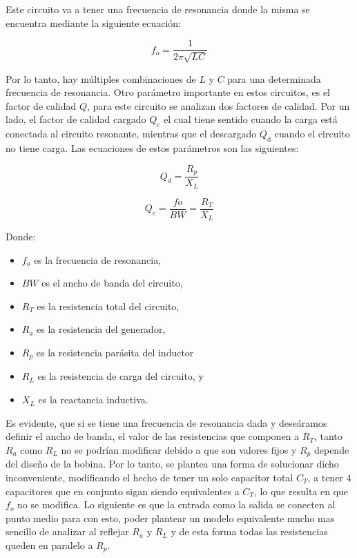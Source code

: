 \hspace{1mm} Este circuito va a tener una frecuencia de resonancia donde la misma se encuentra mediante la siguiente ecuación:

\begin{equation}
    f_o = \frac{1}{2\pi \sqrt{LC}}
\end{equation}

\hspace{1mm} Por lo tanto, hay múltiples combinaciones de \(L\) y \(C\) para una determinada frecuencia de resonancia.
Otro parámetro importante en estos circuitos, es el factor de calidad \(Q\), para este circuito se analizan dos factores de calidad. Por un lado, el factor de calidad cargado \( Q_{\text{c}} \) el cual tiene sentido cuando la carga está conectada al circuito resonante, mientras que el descargado \( Q_{\text{d}} \) cuando el circuito no tiene carga. Las ecuaciones de estos parámetros son las siguientes:

\begin{equation}
    Q_d = \frac{R_p}{X_L} 
\end{equation}

\begin{equation}
    Q_c = \frac{fo}{BW} = \frac{R_T}{X_L}
\end{equation}

\newpage
Donde:
\begin{itemize}
    \item \( f_o \) es la frecuencia de resonancia,
    \item \( BW \) es el ancho de banda del circuito,
    \item \( R_T \) es la resistencia total del circuito,
    \item \( R_a \) es la resistencia del generador,
    \item \( R_p \) es la resistencia parásita del inductor
    \item \( R_L \) es la resistencia de carga del circuito, y
    \item \( X_L \) es la reactancia inductiva. 
    
\end{itemize}

Es evidente, que si se tiene una frecuencia de resonancia dada y deseáramos definir el ancho de banda, el valor de las resistencias que componen a \( R_T \), tanto \( R_a \) como  \( R_L \) no se podrían modificar debido a que son valores fijos y \( R_p \) depende del diseño de la bobina. Por lo tanto, se plantea una forma de solucionar dicho inconveniente, modificando el hecho de tener un solo capacitor total \(C_T\), a tener 4 capacitores que en conjunto sigan siendo equivalentes a \(C_T\), lo que resulta en que \( f_o \) no se modifica. Lo siguiente es que la entrada como la salida se conecten al punto medio para con esto, poder plantear un modelo equivalente mucho mas sencillo de analizar al reflejar \( R_a \) y \( R_L \) y de esta forma todas las resistencias queden en paralelo a \( R_p \).

